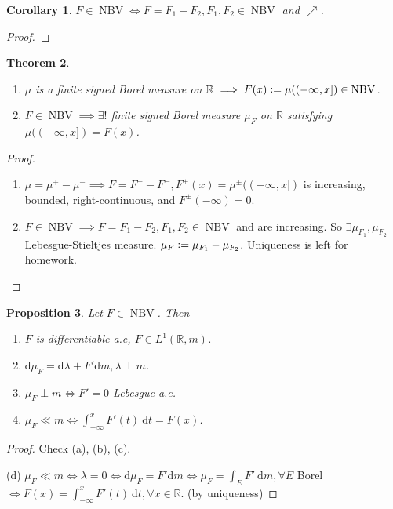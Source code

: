 \documentclass{report}
\newcommand{\R}{\mathbb{R}}
\def \NBV {\operatorname{NBV}}
\newcommand{\df}{\ \mathrm{d}}
\newcommand{\ndf}{\mathrm{d}}
\newcommand{\defeq}{\vcentcolon=}
\newtheorem{theorem}{Theorem}[chapter]
\newtheorem{corollary}[theorem]{Corollary}
\newtheorem{proposition}[theorem]{Proposition}
\theoremstyle{definition}
\theoremstyle{remark}
\newcommand{\fnl}{\parbox[t]{0\linewidth}{}}
\begin{document}
\begin{corollary}
	$F \in \operatorname{NBV} \iff F = F_1 - F_2, F_1, F_2 \in \operatorname{NBV}$ and $\nearrow$.
\end{corollary}
\begin{proof}

\end{proof}

\begin{theorem}\fnl
	\begin{enumerate}
		\item $\mu$ is a finite \emph{signed} Borel measure on $\R \implies F(x) \defeq \mu((-\infty, x]) \in \operatorname{NBV}$.
		\item $F \in \NBV \implies \exists!$ finite \emph{signed} Borel measure $\mu_F$ on $\R$ satisfying $\mu((-\infty, x]) = F(x)$.
	\end{enumerate}
\end{theorem}

\begin{proof}
	\begin{enumerate}
		\item $\mu = \mu^+ - \mu^- \implies F = F^+ - F^-, F^\pm (x) = \mu^\pm ((-\infty, x])$ is increasing, bounded, right-continuous, and $F^\pm (-\infty) = 0$. 
		\item $F \in \NBV \implies F = F_1 - F_2, F_1, F_2 \in \NBV$ and are increasing. So $\exists \mu_{F_1}, \mu_{F_2}$ Lebesgue-Stieltjes measure. $\mu_F \defeq \mu_{F_1} - \mu_{F_2}$. Uniqueness is left for homework.
	\end{enumerate}
\end{proof}

\begin{proposition}
	Let $F \in \NBV$. Then \begin{enumerate}
		\item $F$ is differentiable a.e, $F \in L^1(\R, m)$.
		\item $\ndf \mu_{F} = \ndf \lambda + F' \ndf m, \lambda \perp m$.
		\item $\mu_F \perp m \iff F' = 0$ Lebesgue a.e.
		\item $\mu_F \ll m \iff \displaystyle \int_{-\infty}^x F'(t)\df t = F(x)$.
	\end{enumerate}
\end{proposition}
\begin{proof}
	Check (a), (b), (c).

	(d) $\mu_F \ll m \iff \lambda = 0 \iff \ndf \mu_F = F' \ndf m \iff \mu_F = \int_E F' \df m, \forall E$ Borel $\iff F(x) = \int_{-\infty}^x F'(t)\df t, \forall x \in \R$. (by uniqueness)
\end{proof}
\end{document}
